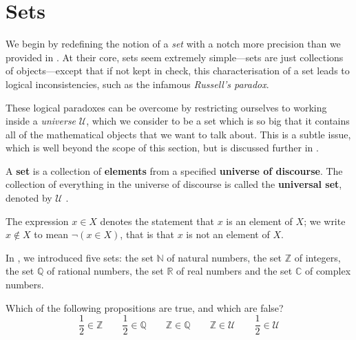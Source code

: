 \section{Sets}

We begin by redefining the notion of a \textit{set} with a notch more precision than we provided in . At their core, sets seem extremely simple---sets are just collections of objects---except that if not kept in check, this characterisation of a set leads to logical inconsistencies, such as the infamous \textit{Russell's paradox}.

These logical paradoxes can be overcome by restricting ourselves to working inside a \textit{universe} $\mathcal{U}$, which we consider to be a set which is so big that it contains all of the mathematical objects that we want to talk about. This is a subtle issue, which is well beyond the scope of this section, but is discussed further in .

\begin{definition}
\label{defSet}
A \textbf{set} is a collection of \textbf{elements} from a specified \textbf{universe of discourse}. The collection of everything in the universe of discourse is called the \textbf{universal set}, denoted by $\mathcal{U}$ .

The expression $x \in X$  denotes the statement that $x$ is an element of $X$; we write $x \not \in X$  to mean $\neg (x \in X)$, that is that $x$ is not an element of $X$.
\end{definition}

\begin{example}
In , we introduced five sets: the set $\mathbb{N}$ of natural numbers, the set $\mathbb{Z}$ of integers, the set $\mathbb{Q}$ of rational numbers, the set $\mathbb{R}$ of real numbers and the set $\mathbb{C}$ of complex numbers.
\end{example}

\begin{exercise}
Which of the following propositions are true, and which are false?
\[ \frac{1}{2} \in \mathbb{Z} \qquad \frac{1}{2} \in \mathbb{Q} \qquad \mathbb{Z} \in \mathbb{Q} \qquad \mathbb{Z} \in \mathcal{U} \qquad \frac{1}{2} \in \mathcal{U} \]
\end{exercise}

